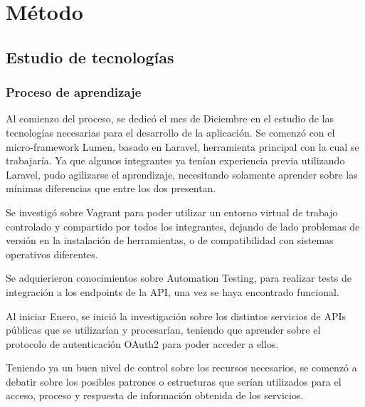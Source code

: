 \chapter{Método}

\ifpdf
    \graphicspath{{Chapter3/Figs/Raster/}{Chapter3/Figs/PDF/}{Chapter3/Figs/}}
\else
    \graphicspath{{Chapter3/Figs/Vector/}{Chapter3/Figs/}}
\fi

\section{Estudio de tecnologías}

\subsection{Proceso de aprendizaje}

Al comienzo del proceso, se dedicó el mes de Diciembre en el estudio de las tecnologías necesarias para el desarrollo de la aplicación.
Se comenzó con el micro-framework Lumen, basado en Laravel, herramienta principal con la cual se trabajaría. 
Ya que algunos integrantes ya tenían experiencia previa utilizando Laravel, pudo agilizarse el aprendizaje, necesitando solamente aprender sobre las mínimas diferencias que entre los dos presentan.

Se investigó sobre Vagrant para poder utilizar un entorno virtual de trabajo controlado y compartido por todos los integrantes, dejando de lado problemas de versión en la instalación de herramientas, o de compatibilidad con sistemas operativos diferentes.

Se adquierieron conocimientos sobre Automation Testing, para realizar tests de integración a los endpoints de la API, una vez se haya encontrado funcional.

Al iniciar Enero, se inició la investigación sobre los distintos servicios de APIs públicas que se utilizarían y procesarían, teniendo que aprender sobre el protocolo de autenticación OAuth2 para poder acceder a ellos.

Teniendo ya un buen nivel de control sobre los recursos necesarios, se comenzó a debatir sobre los posibles patrones o estructuras que serían utilizados para el acceso, proceso y respuesta de información obtenida de los servicios.

